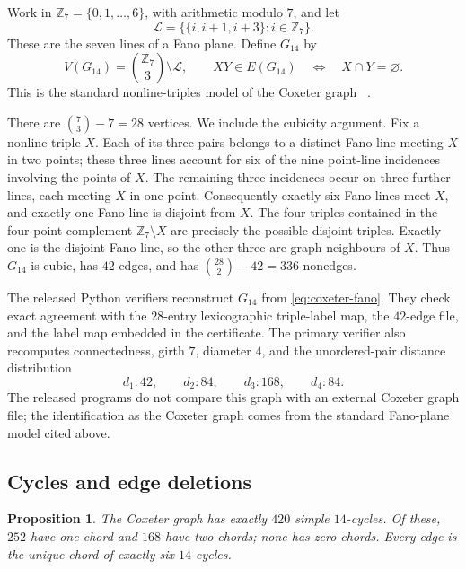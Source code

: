 \documentclass[11pt]{amsart}
\newcommand{\Z}{\mathbb{Z}}
\newcommand{\Gfourteen}{G_{14}}
\newtheorem{proposition}[proposition]{Proposition}
\theoremstyle{definition}
\theoremstyle{remark}
\begin{document}
Work in \(\Z_7=\{0,1,\ldots,6\}\), with arithmetic modulo \(7\), and let
\[
  \mathcal L=\bigl\{\{i,i+1,i+3\}:i\in\Z_7\bigr\}.
\]
These are the seven lines of a Fano plane.  Define \(\Gfourteen\) by
\begin{equation}\label{eq:coxeter-fano}
  V(\Gfourteen)=\binom{\Z_7}{3}\setminus\mathcal L,
  \qquad
  XY\in E(\Gfourteen)\quad\Longleftrightarrow\quad X\cap Y=\varnothing .
\end{equation}
This is the standard nonline-triples model of the Coxeter graph
~\cite{Coxeter1950,HarutyunyanEtAl2016}.

There are \(\binom{7}{3}-7=28\) vertices.  We include the cubicity argument.
Fix a nonline triple \(X\).  Each of its three pairs belongs to a distinct
Fano line meeting \(X\) in two points; these three lines account for six of
the nine point-line incidences involving the points of \(X\).  The remaining
three incidences occur on three further lines, each meeting \(X\) in one
point.  Consequently exactly six Fano lines meet \(X\), and exactly one Fano
line is disjoint from \(X\).  The four triples contained in the four-point
complement \(\Z_7\setminus X\) are precisely the possible disjoint triples.
Exactly one is the disjoint Fano line, so the other three are graph
neighbours of \(X\).  Thus \(\Gfourteen\) is cubic, has \(42\) edges, and has
\(\binom{28}{2}-42=336\) nonedges.

The released Python verifiers reconstruct \(\Gfourteen\) from
\cref{eq:coxeter-fano}.  They check exact agreement with the
\(28\)-entry lexicographic triple-label map, the \(42\)-edge file, and the
label map embedded in the certificate.  The primary verifier also recomputes
connectedness, girth \(7\), diameter \(4\), and the unordered-pair distance
distribution
\[
  d_1:42,\qquad d_2:84,\qquad d_3:168,\qquad d_4:84.
\]
The released programs do not compare this graph with an external Coxeter
graph file; the identification as the Coxeter graph comes from the standard
Fano-plane model cited above.

\subsection{Cycles and edge deletions}

\begin{proposition}\label{prop:c14-cycles}
The Coxeter graph has exactly \(420\) simple \(14\)-cycles.  Of these,
\(252\) have one chord and \(168\) have two chords; none has zero chords.
Every edge is the unique chord of exactly six \(14\)-cycles.
\end{proposition}
\end{document}
